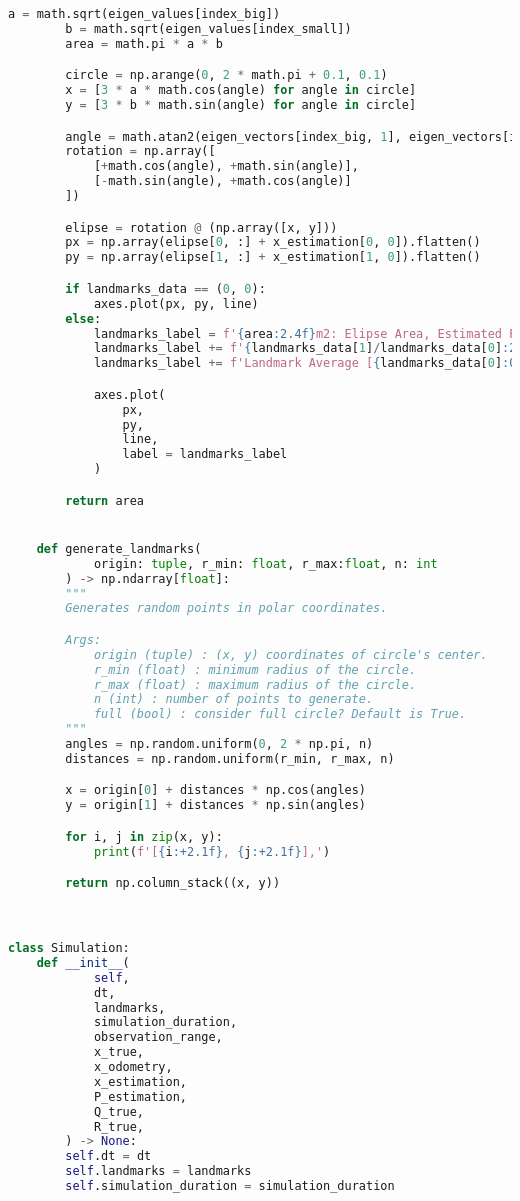\documentclass[../CSC_5RO12_TA_TP4.tex]{subfiles}
\begin{document}
\begin{scriptsize}
\begin{lstlisting}[language=Python]
        a = math.sqrt(eigen_values[index_big])
        b = math.sqrt(eigen_values[index_small])
        area = math.pi * a * b

        circle = np.arange(0, 2 * math.pi + 0.1, 0.1)
        x = [3 * a * math.cos(angle) for angle in circle]
        y = [3 * b * math.sin(angle) for angle in circle]

        angle = math.atan2(eigen_vectors[index_big, 1], eigen_vectors[index_big, 0])
        rotation = np.array([
            [+math.cos(angle), +math.sin(angle)],
            [-math.sin(angle), +math.cos(angle)]
        ])

        elipse = rotation @ (np.array([x, y]))
        px = np.array(elipse[0, :] + x_estimation[0, 0]).flatten()
        py = np.array(elipse[1, :] + x_estimation[1, 0]).flatten()

        if landmarks_data == (0, 0):
            axes.plot(px, py, line)
        else:
            landmarks_label = f'{area:2.4f}m2: Elipse Area, Estimated Position\n'
            landmarks_label += f'{landmarks_data[1]/landmarks_data[0]:2.4f}m2: Elipse Area, '
            landmarks_label += f'Landmark Average [{landmarks_data[0]:02d}]'

            axes.plot(
                px,
                py,
                line,
                label = landmarks_label
            )

        return area


    def generate_landmarks(
            origin: tuple, r_min: float, r_max:float, n: int
        ) -> np.ndarray[float]:
        """
        Generates random points in polar coordinates.

        Args:
            origin (tuple) : (x, y) coordinates of circle's center.
            r_min (float) : minimum radius of the circle.
            r_max (float) : maximum radius of the circle.
            n (int) : number of points to generate.
            full (bool) : consider full circle? Default is True.
        """
        angles = np.random.uniform(0, 2 * np.pi, n)
        distances = np.random.uniform(r_min, r_max, n)

        x = origin[0] + distances * np.cos(angles)
        y = origin[1] + distances * np.sin(angles)

        for i, j in zip(x, y):
            print(f'[{i:+2.1f}, {j:+2.1f}],')

        return np.column_stack((x, y))



class Simulation:
    def __init__(
            self,
            dt,
            landmarks,
            simulation_duration,
            observation_range,
            x_true,
            x_odometry,
            x_estimation,
            P_estimation,
            Q_true,
            R_true,
        ) -> None:
        self.dt = dt
        self.landmarks = landmarks
        self.simulation_duration = simulation_duration


\end{lstlisting}
\end{scriptsize}
\end{document}
